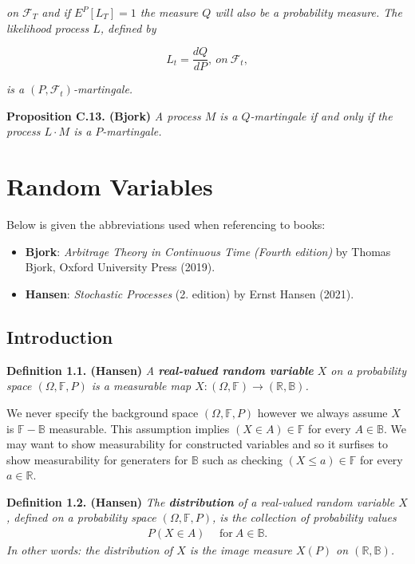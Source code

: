 \documentclass[a4paper,12pt,openany]{book}
\providecommand{\tightlist}{%
 \setlength{\itemsep}{0pt}\setlength{\parskip}{0pt}}
\begin{document}
\emph{on \(\mathcal{F}_T\) and if \(E^P[L_T]=1\) the measure \(Q\) will also be a probability measure. The likelihood process \(L\), defined by}

\[
L_t=\frac{dQ}{dP},\ on\ \mathcal{F}_t,\tag{C.8}
\]

\emph{is a \((P,\mathcal{F}_t)\)-martingale.}

\textbf{Proposition C.13. (Bjork)} \emph{A process \(M\) is a \(Q\)-martingale if and only if the process \(L\cdot M\) is a \(P\)-martingale.}

\hypertarget{random-variables-1}{%
\chapter{Random Variables}\label{random-variables-1}}

Below is given the abbreviations used when referencing to books:

\begin{itemize}
\tightlist
\item
  \textbf{Bjork}: \emph{Arbitrage Theory in Continuous Time (Fourth edition)} by Thomas Bjork, Oxford University Press (2019).\cite{bjork2009}
\item
  \textbf{Hansen}: \emph{Stochastic Processes} (2. edition) by Ernst Hansen (2021).\cite{hansen2021}
\end{itemize}

\hypertarget{introduction-1}{%
\section{Introduction}\label{introduction-1}}

\textbf{Definition 1.1. (Hansen)} \emph{A \textbf{real-valued random variable} \(X\) on a probability space \((\Omega, \mathbb{F},P)\) is a measurable map \(X : (\Omega,\mathbb{F})\to (\mathbb{R},\mathbb{B})\).}

We never specify the background space \((\Omega, \mathbb{F},P)\) however we always assume \(X\) is \(\mathbb{F}-\mathbb{B}\) measurable. This assumption implies \((X\in A)\in \mathbb{F}\) for every \(A\in \mathbb{B}\). We may want to show measurability for constructed variables and so it surfises to show measurability for generaters for \(\mathbb{B}\) such as checking \((X\le a)\in\mathbb{F}\) for every \(a\in\mathbb{R}\).

\textbf{Definition 1.2. (Hansen)} \emph{The \textbf{distribution} of a real-valued random variable \(X\), defined on a probability space \((\Omega,\mathbb{F},P)\), is the collection of probability values}
\begin{align*}
    P(X\in A)\hspace{15pt}\text{for}\ A\in \mathbb{B}.\tag{1.3}
\end{align*}
\emph{In other words: the distribution of \(X\) is the image measure \(X(P)\) on \((\mathbb{R},\mathbb{B})\).}
\end{document}
